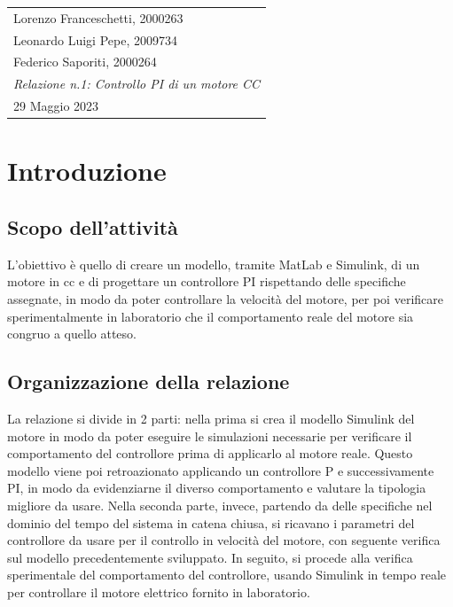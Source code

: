 \documentclass[a4paper, 11pt]{article}
\newcommand{\class}{Laboratorio di Automatica}
\newcommand{\expT}{Controllo PI di un motore CC}
\newcommand{\repN}{1}
\newcommand{\stud}{Lorenzo Franceschetti, 2000263\\ Leonardo Luigi Pepe, 2009734\\ Federico Saporiti, 2000264}
\newcommand{\dateD}{29 Maggio 2023}
\begin{document}

\begin{center}
\begin{tabular}{| p{\textwidth} |}
    \hline
    \large
    \vspace{-2pt}
    \stud \hfill
    \Large
    \begin{center}
    {\color{BrickRed}
        \textsl{\class}\\
        \textsl{Relazione n.\repN: \expT}\\
        \large
        \dateD}
    \vspace{-4mm}
    \end{center}\\
    \hline
\end{tabular}
\end{center}

\section{Introduzione}
\subsection{Scopo dell'attività}
L'obiettivo è quello di creare un modello, tramite MatLab e Simulink, di un motore in cc e di progettare un controllore PI rispettando delle specifiche assegnate, in modo da poter controllare la velocità del motore, per poi verificare sperimentalmente in laboratorio che il comportamento reale del motore sia congruo a quello atteso.
\subsection{Organizzazione della relazione}
La relazione si divide in 2 parti: nella prima si crea il modello Simulink del motore in modo da poter eseguire le simulazioni necessarie per verificare il comportamento del controllore prima di applicarlo al motore reale. Questo modello viene poi retroazionato applicando un controllore P e successivamente PI, in modo da evidenziarne il diverso comportamento e valutare la tipologia migliore da usare. Nella seconda parte, invece, partendo da delle specifiche nel dominio del tempo del sistema in catena chiusa, si ricavano i parametri del controllore da usare per il controllo in velocità del motore, con seguente verifica sul modello precedentemente sviluppato. In seguito, si procede alla verifica sperimentale del comportamento del controllore, usando Simulink in tempo reale per controllare il motore elettrico fornito in laboratorio.
\end{document}

